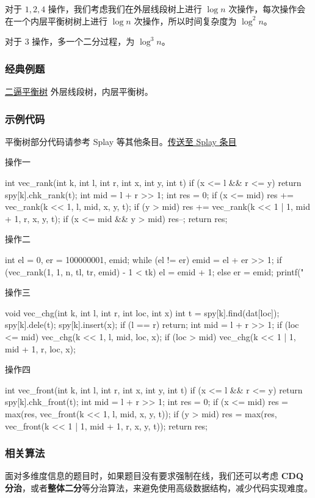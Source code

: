 对于 $1,2,4$ 操作，我们考虑我们在外层线段树上进行 $\log{n}$ 次操作，每次操作会在一个内层平衡树树上进行 $\log{n}$ 次操作，所以时间复杂度为 $\log^2{n}$。

对于 $3$ 操作，多一个二分过程，为 $\log^3{n}$。

\subsubsection{经典例题}

\href{https://www.lydsy.com/JudgeOnline/problem.php?id=3196}{二逼平衡树} 外层线段树，内层平衡树。

\subsubsection{示例代码}

平衡树部分代码请参考 Splay 等其他条目。\href{/ds/splay/}{传送至 Splay 条目}

操作一

\begin{cppcode}
int vec_rank(int k, int l, int r, int x, int y, int t) {
  if (x <= l && r <= y) {
    return spy[k].chk_rank(t);
  }
  int mid = l + r >> 1;
  int res = 0;
  if (x <= mid) res += vec_rank(k << 1, l, mid, x, y, t);
  if (y > mid) res += vec_rank(k << 1 | 1, mid + 1, r, x, y, t);
  if (x <= mid && y > mid) res--;
  return res;
}
\end{cppcode}

操作二

\begin{cppcode}
int el = 0, er = 100000001, emid;
while (el != er) {
  emid = el + er >> 1;
  if (vec_rank(1, 1, n, tl, tr, emid) - 1 < tk)
    el = emid + 1;
  else
    er = emid;
}
printf("%
\end{cppcode}

操作三

\begin{cppcode}
void vec_chg(int k, int l, int r, int loc, int x) {
  int t = spy[k].find(dat[loc]);
  spy[k].dele(t);
  spy[k].insert(x);
  if (l == r) return;
  int mid = l + r >> 1;
  if (loc <= mid) vec_chg(k << 1, l, mid, loc, x);
  if (loc > mid) vec_chg(k << 1 | 1, mid + 1, r, loc, x);
}
\end{cppcode}

操作四

\begin{cppcode}
int vec_front(int k, int l, int r, int x, int y, int t) {
  if (x <= l && r <= y) return spy[k].chk_front(t);
  int mid = l + r >> 1;
  int res = 0;
  if (x <= mid) res = max(res, vec_front(k << 1, l, mid, x, y, t));
  if (y > mid) res = max(res, vec_front(k << 1 | 1, mid + 1, r, x, y, t));
  return res;
}
\end{cppcode}

\subsubsection{相关算法}

面对多维度信息的题目时，如果题目没有要求强制在线，我们还可以考虑 \textbf{CDQ 分治}，或者\textbf{整体二分}等分治算法，来避免使用高级数据结构，减少代码实现难度。

